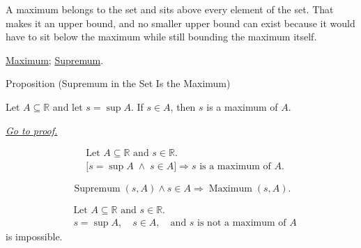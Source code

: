 \begin{remark*}[Interpretation]
A maximum belongs to the set and sits above every element of the set. That makes it an upper bound, and no smaller upper bound can exist because it would have to sit below the maximum while still bounding the maximum itself.
\end{remark*}

\begin{dependencies}
\hyperref[def:maximum]{Maximum};
\hyperref[def:supremum]{Supremum}.
\end{dependencies}


\begin{propositionbox}{Proposition (Supremum in the Set Is the Maximum)}
\begin{proposition}
\label{prop:supremum-in-the-set-is-the-maximum}
Let $A\subseteq\mathbb{R}$ and let $s=\sup A$. If $s\in A$, then $s$ is a maximum of $A$.

\smallskip
\noindent
\hyperref[prf:supremum-in-the-set-is-the-maximum]{\textit{Go to proof.}}
\end{proposition}
\end{propositionbox}

\begin{remark*}
\[
\begin{aligned}
&\text{Let }A\subseteq\mathbb{R}\text{ and }s\in\mathbb{R}.\\
&\bigl[s=\sup A\;\land\;s\in A\bigr]
\Longrightarrow
s\text{ is a maximum of }A.
\end{aligned}
\]
\end{remark*}

\begin{remark*}
\[
\operatorname{Supremum}(s,A)\land s\in A
\Longrightarrow
\operatorname{Maximum}(s,A).
\]
\end{remark*}

\begin{remark*}
\[
\begin{aligned}
&\text{Let }A\subseteq\mathbb{R}\text{ and }s\in\mathbb{R}.\\
&s=\sup A,\quad s\in A,\quad\text{and }s\text{ is not a maximum of }A
\end{aligned}
\]
is impossible.
\end{remark*}


